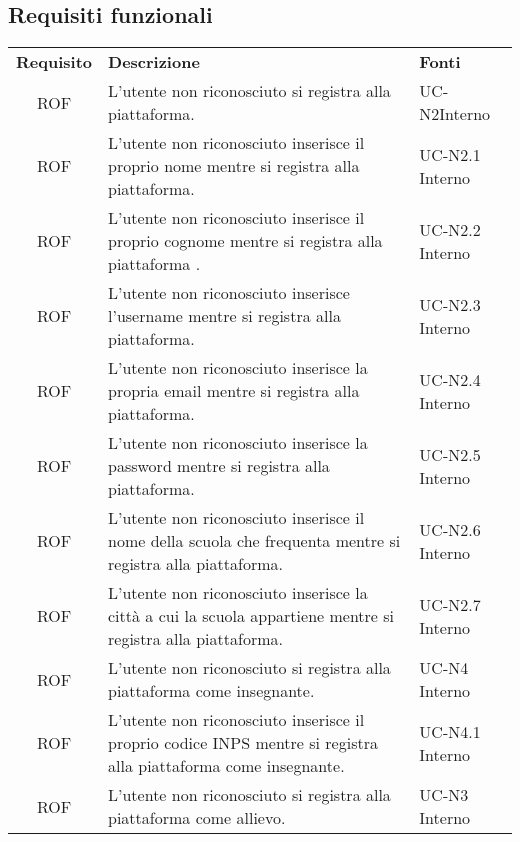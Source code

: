 \subsection{Requisiti funzionali}
\begin{tabularx}{\textwidth}{| c | p{10cm} | X |}
		\rowcolor{LightBlue}
		\color{white}\bfseries Requisito & \color{white}\bfseries Descrizione & \color{white}\bfseries Fonti\\[0.25cm]
		ROF & L'utente non riconosciuto si registra alla piattaforma. & UC-N2\newline Interno\\
		ROF & L'utente non riconosciuto inserisce il proprio nome mentre si registra alla piattaforma. & UC-N2.1 \newline Interno\\
		ROF & L'utente non riconosciuto inserisce il proprio cognome mentre si registra alla piattaforma . & UC-N2.2 \newline Interno\\
		ROF & L'utente non riconosciuto inserisce l'username mentre si registra alla piattaforma. & UC-N2.3 \newline Interno\\
		ROF & L'utente non riconosciuto inserisce la propria email mentre si registra alla piattaforma. & UC-N2.4 \newline Interno\\
		ROF & L'utente non riconosciuto inserisce la password mentre si registra alla piattaforma. & UC-N2.5 \newline Interno\\
		ROF & L'utente non riconosciuto inserisce il nome della scuola che frequenta mentre si registra alla piattaforma. & UC-N2.6 \newline Interno\\
		ROF & L'utente non riconosciuto inserisce la città a cui la scuola appartiene mentre si registra alla piattaforma. & UC-N2.7 \newline Interno\\
		ROF & L'utente non riconosciuto si registra alla piattaforma come insegnante. & UC-N4 \newline Interno\\
		ROF & L'utente non riconosciuto inserisce il proprio codice INPS mentre si registra alla piattaforma come insegnante. & UC-N4.1 \newline Interno\\
		ROF & L'utente non riconosciuto si registra alla piattaforma come allievo. & UC-N3 \newline Interno\\	

\end{tabularx}
